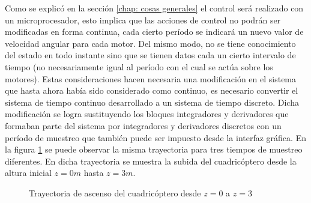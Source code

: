 \documentclass[main]{subfiles}
\begin{document}
Como se explic\'o en la secci\'on \ref{chap: cosas generales} el control ser\'a realizado con un microprocesador, esto implica que las acciones de control no podr\'an ser modificadas en forma continua, cada cierto per\'iodo se indicar\'a un nuevo valor de velocidad angular para cada motor. Del mismo modo, no se tiene conocimiento del estado en todo instante sino que se tienen datos cada un cierto intervalo de tiempo (no necesariamente igual al per\'iodo con el cual se act\'ua sobre los motores). Estas consideraciones hacen necesaria una modificaci\'on en el sistema que hasta ahora hab\'ia sido considerado como continuo, es necesario convertir el sistema de tiempo continuo desarrollado a un sistema de tiempo discreto. Dicha modificaci\'on se logra sustituyendo los bloques integradores y derivadores que formaban parte del sistema por integradores y derivadores discretos con un per\'iodo de muestreo que tambi\'en puede ser impuesto desde la interfaz gr\'afica. En la figura \ref{fig:t_muestreo} se puede observar la misma trayectoria para tres tiempos de muestreo diferentes. En dicha trayectoria se muestra la subida del cuadric\'optero desde la altura inicial $z=0m$ hasta $z=3m$. 
 
\begin{figure} [h!]
  \centering
  \caption{Trayectoria de ascenso del cuadric\'optero desde $z=0$ a $z=3$}
  \label{fig:t_muestreo}
\end{figure} 
 
\end{document}
